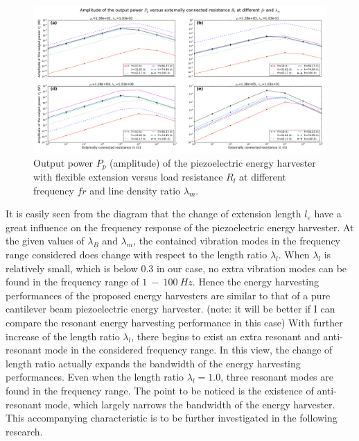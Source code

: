 \documentclass{elsarticle}
\begin{document}
\begin{figure}[!htbp]
    \centering
    \includegraphics[width=\textwidth]{./fig_pow_lamm_list_vs_fr_Rl}
    \caption{Output power $P_p$ (amplitude) of the piezoelectric energy harvester with flexible extension versus load resistance $R_l$ at different frequency $fr$ and line density ratio $\lambda_m$. }
    \label{fig:fig_pow_lamm_list_vs_fr_Rl}
\end{figure}


It is easily seen from the diagram that the change of extension length $l_e$ have a great influence on the frequency response of the piezoelectric energy harvester. At the given values of $\lambda_B$ and $\lambda_m$, the contained vibration modes in the frequency range considered does change with respect to
the length ratio $\lambda_l$. When $\lambda_l$ is relatively small, which is below $0.3$ in our case, no extra vibration modes can be found in the frequency range of $1\ - \ 100\ Hz$. Hence the energy harvesting performances of the proposed energy harvesters are similar to that of a pure cantilever beam piezoelectric energy harvester. (note: it will be better if I can compare the resonant energy harvesting performance in this case) With further increase of the length ratio $\lambda_l$, there begins to exist an extra resonant and anti-resonant mode in the considered frequency range. In this view, the change of length ratio actually expands the bandwidth of the energy harvesting performances. Even when the length ratio $\lambda_l = 1.0$, three resonant modes are found in the frequency range. The point to be noticed is the existence of anti-resonant mode, which largely narrows the bandwidth of the energy harvester. This accompanying characteristic is to be further investigated in the following research. 
\end{document}
